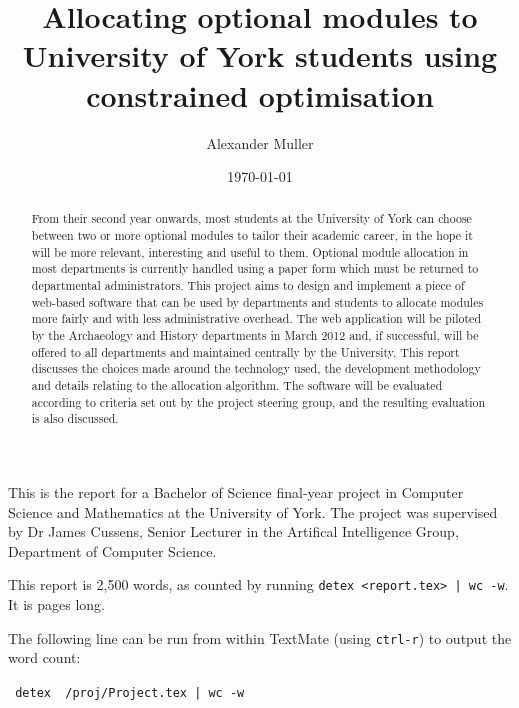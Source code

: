 \documentclass[]{scrartcl}
\title{Allocating optional modules to University of York students using constrained optimisation}
\author{Alexander Muller}
\date{\today}
\begin{document}
\ifpdf
{}
\else
{}
\fi

\maketitle

This is the report for a Bachelor of Science final-year project in Computer
Science and Mathematics at the University of York. The project was supervised
by Dr James Cussens, Senior Lecturer in the Artifical Intelligence Group,
Department of Computer Science.

This report is 2,500 words, as counted by running \texttt{detex <report.tex> |
wc -w}. It is \pageref{LastPage} pages long.


The following line can be run from within TextMate (using \texttt{ctrl-r}) to
output the word count:

\texttt{
detex ~/proj/Project.tex | wc -w
}

\newpage

\begin{abstract}
  From their second year onwards, most students at the University of York can  choose between two or more optional modules to tailor their academic career, in the hope it will be more relevant, interesting and useful to them.
  Optional module allocation in most departments is currently handled using a paper form which must be returned to departmental administrators. This project aims to design and implement a piece of web-based software that can be used by departments and students to allocate modules more fairly and with less administrative overhead.
  The web application will be piloted by the Archaeology and History departments in March 2012 and, if successful, will be offered to all departments and maintained centrally by the University.
  This report discusses the choices made around the technology used, the development methodology and details relating to the allocation algorithm.
  The software will be evaluated according to criteria set out by the project steering group, and the resulting evaluation is also discussed.
\end{abstract}
\end{document}
